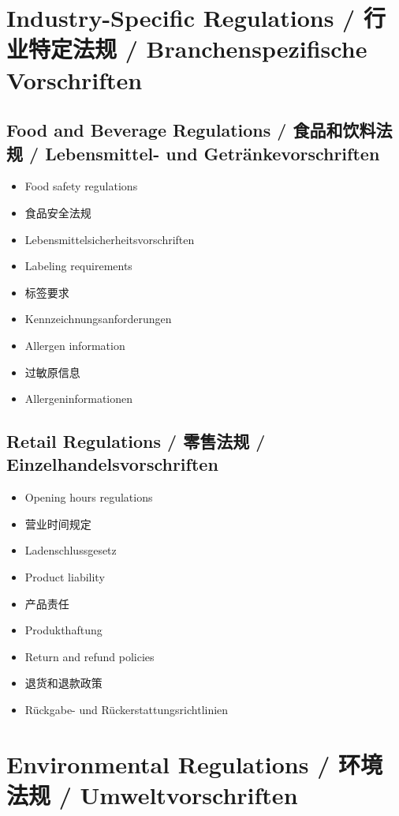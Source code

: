 \section{Industry-Specific Regulations / 行业特定法规 / Branchenspezifische Vorschriften}

\subsection{Food and Beverage Regulations / 食品和饮料法规 / Lebensmittel- und Getränkevorschriften}
\begin{itemize}
    \item Food safety regulations
    \item 食品安全法规
    \item Lebensmittelsicherheitsvorschriften
    \item Labeling requirements
    \item 标签要求
    \item Kennzeichnungsanforderungen
    \item Allergen information
    \item 过敏原信息
    \item Allergeninformationen
\end{itemize}

\subsection{Retail Regulations / 零售法规 / Einzelhandelsvorschriften}
\begin{itemize}
    \item Opening hours regulations
    \item 营业时间规定
    \item Ladenschlussgesetz
    \item Product liability
    \item 产品责任
    \item Produkthaftung
    \item Return and refund policies
    \item 退货和退款政策
    \item Rückgabe- und Rückerstattungsrichtlinien
\end{itemize}

\section{Environmental Regulations / 环境法规 / Umweltvorschriften}

